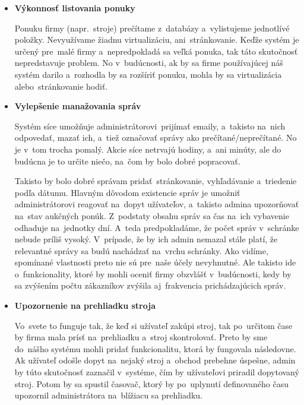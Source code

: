 \begin{itemize}
\item \textbf{Výkonnosť listovania ponuky}

Ponuku firmy (napr.~stroje) prečítame z~databázy a~vylistujeme jednotlívé položky. Nevyužívame žiadnu virtualizáciu, ani~stránkovanie. Keďže systém je určený pre~malé firmy a~nepredpokladá sa veľká ponuka, tak táto skutočnosť nepredstavuje problem. No v~budúcnosti, ak by sa firme používajúcej náš systém darilo a~rozhodla by sa rozšíriť ponuku, mohla by sa virtualizácia alebo~stránkovanie hodiť.

\item \textbf{Vylepšenie manažovania správ}

Systém síce umožňuje administrátorovi~prijímať emaily, a~takisto na~nich odpovedať, mazať ich, a~tiež označovať správy ako prečítané/neprečítané. No je v~tom trocha pomalý. Akcie síce netrvajú hodiny, a~ani minúty, ale do budúcna je to určite niečo, na~čom by bolo dobré popracovať.

Takisto by bolo dobré správam pridať~stránkovanie, vyhľadávanie a~triedenie podľa dátumu. Hlavným dôvodom existencie správ je umožniť administrátorovi reagovať na~dopyt užívateľov, a~takisto admina upozorňovať na~stav aukčných ponúk. Z~podstaty obsahu správ sa čas na~ich vybavenie odhaduje na~jednotky dní. A~teda predpokladáme, že počet správ v~schránke nebude príliš vysoký. V~prípade, že by ich admin nemazal stále platí, že relevantné správy sa budú nachádzať na~vrchu schránky. Ako vidíme, spomínané vlastnosti preto nie sú pre~naše účely nevyhnutné. Ale takisto ide o~funkcionality, ktoré by mohli oceniť firmy obzvlášť v~budúcnosti, kedy by sa zvýšením počtu zákazníkov zvýšila aj~frakvencia prichádzajúcich správ.

\item \textbf{Upozornenie na prehliadku stroja}

Vo~svete to funguje tak, že keď si užívateľ zakúpi stroj, tak po~určitom čase by firma mala prísť na~prehliadku a~stroj skontrolovať. Preto by sme do~nášho systému mohli pridať funkcionalitu, ktorá by fungovala následovne. Ak užívateľ odošle dopyt na~nejaký stroj a~obchod prebehne úspešne, admin by túto skutočnosť zaznačil v~systéme, čím by užívateľovi priradil dopytovaný stroj. Potom by sa spustil časovač, ktorý by po~uplynutí definovaného času upozornil administrátora na~blížiacu sa prehliadku.
\end{itemize}
